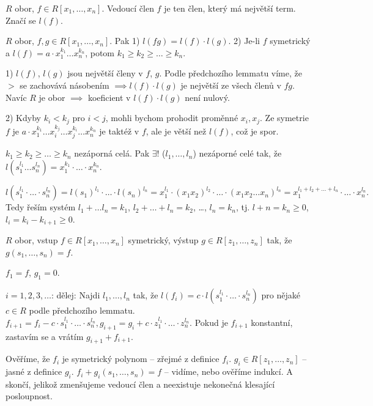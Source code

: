 \documentclass[12pt]{article}                   %
\begin{document}
    \begin{definice}
        $R$ obor, $f \in R[x_1, …, x_n]$. Vedoucí člen $f$ je ten člen, který má největší term. Značí se $l(f)$.
    \end{definice}

    \begin{lemma}
        $R$ obor, $f, g \in R[x_1, …, x_n]$. Pak 1) $l(fg) = l(f)·l(g)$. 2) Je-li $f$ symetrický a $l(f) = a·x_1^{k_1}…x_n^{k_n}$, potom $k_1 ≥ k_2 ≥ … ≥ k_n$.
        \begin{dukazin}
            1) $l(f)$, $l(g)$ jsou největší členy v $f$, $g$. Podle předchozího lemmatu víme, že $>$ se zachovává násobením $\implies l(f)·l(g)$ je největší ze všech členů v $fg$. Navíc $R$ je obor $\implies$ koeficient v $l(f)·l(g)$ není nulový.

            2) Kdyby $k_i < k_j$ pro $i < j$, mohli bychom prohodit proměnné $x_i, x_j$. Ze symetrie $f$ je $a·x_1^{k_1}…x_i^{k_j}…x_j^{k_i}…x_n^{k_n}$ je taktéž v $f$, ale je větší než $l(f)$, což je spor.
        \end{dukazin}
    \end{lemma}


    \begin{lemma}
        $k_1≥k_2≥…≥k_n$ nezáporná celá. Pak $\exists!$ ($l_1, …, l_n$) nezáporné celé tak, že $l(s_1^{l_1}…s_n^{l_n}) = x_1^{k_1}·…·x_n^{k_n}$.

        \begin{dukazin}
            $$ l(s_1^{l_1}·…·s_n^{l_n}) = l(s_1)^{l_1}·…·l(s_n)^{l_n} = x_1^{l_1}·(x_1x_2)^{l_2}·…·(x_1x_2…x_n)^{l_n} = x_1^{l_1 + l_2 + … + l_n}·…·x_n^{l_n}. $$ 
            Tedy řeším systém $l_1 + … l_n = k_1$, $l_2+…+l_n = k_2$, …, $l_n=k_n$, tj. $l+n = k_n ≥ 0$, $l_i = k_i - k_{i+1} ≥ 0$.
        \end{dukazin}
    \end{lemma}

    \begin{definice}
        $R$ obor, vstup $f \in R[x_1, …, x_n]$ symetrický, výstup $g \in R[z_1, …, z_n]$ tak, že $g(s_1, …, s_n) = f$.
        
        $f_1 = f$, $g_1 = 0$.

        $i=1, 2, 3, …$: dělej: Najdi $l_1, …, l_n$ tak, že $l(f_i) = c·l(s_1^{l_1}·…·s_n^{l_n})$ pro nějaké $c \in R$ podle předchozího lemmatu. $f_{i+1} = f_i - c·s_1^{l_1}·…·s_n^{l_n}, g_{i+1} = g_i + c·z_1^{l_1}·…·z_n^{l_n}$. Pokud je $f_{i+1}$ konstantní, zastavím se a vrátím $g_{i+1} + f_{i+1}$.

        \begin{dukazin}
            Ověříme, že $f_i$ je symetrický polynom -- zřejmé z definice $f_i$. $g_i \in R[z_1, …, z_n]$ -- jasné z definice $g_i$. $f_i + g_i(s_1, …, s_n) = f$ -- vidíme, nebo ověříme indukcí. A skončí, jelikož zmenšujeme vedoucí člen a neexistuje nekonečná klesající posloupnost.
        \end{dukazin}
    \end{definice}
\end{document}
